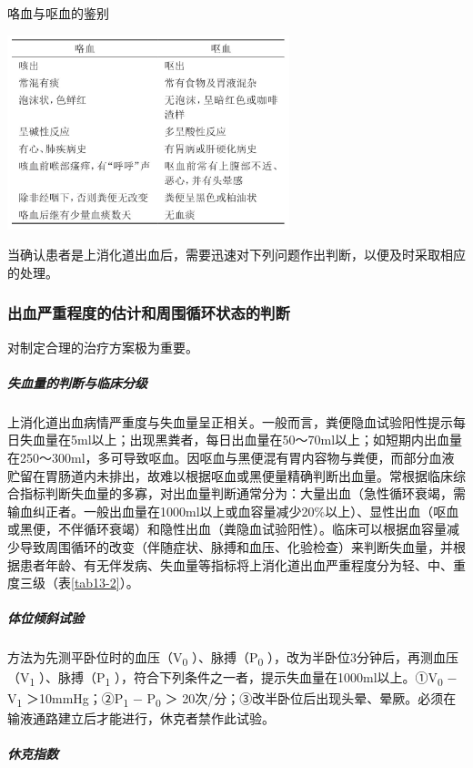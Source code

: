\begin{table}[htbp]
\centering
\caption{咯血与呕血的鉴别}
\label{tab13-1}
\includegraphics[width=3.22917in,height=2.21875in]{./images/Image00053.jpg}
\end{table}

当确认患者是上消化道出血后，需要迅速对下列问题作出判断，以便及时采取相应的处理。

\subsubsection{出血严重程度的估计和周围循环状态的判断}

对制定合理的治疗方案极为重要。

\subparagraph{失血量的判断与临床分级}

上消化道出血病情严重度与失血量呈正相关。一般而言，粪便隐血试验阳性提示每日失血量在5ml以上；出现黑粪者，每日出血量在50～70ml以上；如短期内出血量在250～300ml，多可导致呕血。因呕血与黑便混有胃内容物与粪便，而部分血液贮留在胃肠道内未排出，故难以根据呕血或黑便量精确判断出血量。常根据临床综合指标判断失血量的多寡，对出血量判断通常分为：大量出血（急性循环衰竭，需输血纠正者。一般出血量在1000ml以上或血容量减少20\%以上）、显性出血（呕血或黑便，不伴循环衰竭）和隐性出血（粪隐血试验阳性）。临床可以根据血容量减少导致周围循环的改变（伴随症状、脉搏和血压、化验检查）来判断失血量，并根据患者年龄、有无伴发病、失血量等指标将上消化道出血严重程度分为轻、中、重度三级（表\ref{tab13-2}）。

\subparagraph{体位倾斜试验}

方法为先测平卧位时的血压（V\textsubscript{0}
）、脉搏（P\textsubscript{0}
），改为半卧位3分钟后，再测血压（V\textsubscript{1}
）、脉搏（P\textsubscript{1}
），符合下列条件之一者，提示失血量在1000ml以上。①V\textsubscript{0} −
V\textsubscript{1} ＞10mmHg；②P\textsubscript{1} − P\textsubscript{0} ＞
20次/分；③改半卧位后出现头晕、晕厥。必须在输液通路建立后才能进行，休克者禁作此试验。

\subparagraph{休克指数}

